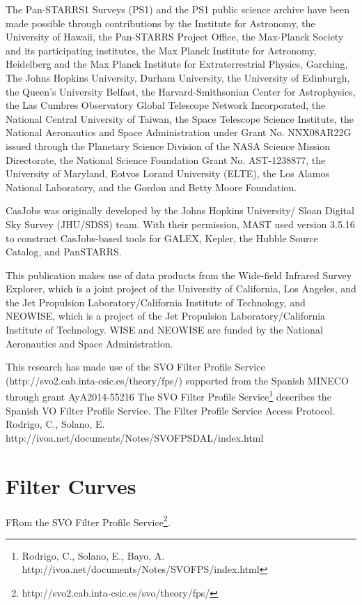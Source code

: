 \documentclass[usenatbib]{mnras}
\begin{document}
The Pan-STARRS1 Surveys (PS1) and the PS1 public science archive have
been made possible through contributions by the Institute for
Astronomy, the University of Hawaii, the Pan-STARRS Project Office,
the Max-Planck Society and its participating institutes, the Max
Planck Institute for Astronomy, Heidelberg and the Max Planck
Institute for Extraterrestrial Physics, Garching, The Johns Hopkins
University, Durham University, the University of Edinburgh, the
Queen's University Belfast, the Harvard-Smithsonian Center for
Astrophysics, the Las Cumbres Observatory Global Telescope Network
Incorporated, the National Central University of Taiwan, the Space
Telescope Science Institute, the National Aeronautics and Space
Administration under Grant No. NNX08AR22G issued through the Planetary
Science Division of the NASA Science Mission Directorate, the National
Science Foundation Grant No. AST-1238877, the University of Maryland,
Eotvos Lorand University (ELTE), the Los Alamos National Laboratory,
and the Gordon and Betty Moore Foundation.

CasJobs was originally developed by the Johns Hopkins University/
Sloan Digital Sky Survey (JHU/SDSS) team. With their permission, MAST
used version 3.5.16 to construct CasJobs-based tools for GALEX,
Kepler, the Hubble Source Catalog, and PanSTARRS.

This publication makes use of data products from the Wide-field
Infrared Survey Explorer, which is a joint project of the University
of California, Los Angeles, and the Jet Propulsion
Laboratory/California Institute of Technology, and NEOWISE, which is a
project of the Jet Propulsion Laboratory/California Institute of
Technology. WISE and NEOWISE are funded by the National Aeronautics
and Space Administration.

This research has made use of the SVO Filter Profile Service
(http://svo2.cab.inta-csic.es/theory/fps/) supported from the Spanish
MINECO through grant AyA2014-55216 
The SVO Filter Profile Service\footnote{Rodrigo, C., Solano, E., Bayo, A. http://ivoa.net/documents/Notes/SVOFPS/index.html}
describes the Spanish VO Filter Profile Service. 
The Filter Profile Service Access Protocol. Rodrigo, C., Solano, E. http://ivoa.net/documents/Notes/SVOFPSDAL/index.html

\newpage

\appendix
\section{Filter Curves} 
FRom the SVO Filter Profile Service\footnote{http://svo2.cab.inta-csic.es/svo/theory/fps/}.
\end{document}
